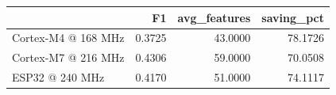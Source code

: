 \begin{tabular}{lrrr}
\toprule
 & F1 & avg_features & saving_pct \\
\midrule
Cortex-M4 @ 168 MHz & 0.3725 & 43.0000 & 78.1726 \\
Cortex-M7 @ 216 MHz & 0.4306 & 59.0000 & 70.0508 \\
ESP32 @ 240 MHz & 0.4170 & 51.0000 & 74.1117 \\
\bottomrule
\end{tabular}

